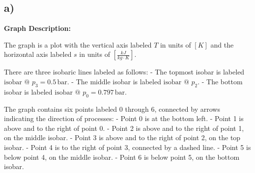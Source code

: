 

\subsection*{a)}

\begin{center}
\textbf{Graph Description:}
\end{center}

The graph is a plot with the vertical axis labeled \( T \) in units of \( [K] \) and the horizontal axis labeled \( s \) in units of \( \left[ \frac{kJ}{kg \cdot K} \right] \). 

There are three isobaric lines labeled as follows:
- The topmost isobar is labeled \( \text{isobar @ } p_3 = 0.5 \, \text{bar} \).
- The middle isobar is labeled \( \text{isobar @ } p_2 \).
- The bottom isobar is labeled \( \text{isobar @ } p_0 = 0.797 \, \text{bar} \).

The graph contains six points labeled 0 through 6, connected by arrows indicating the direction of processes:
- Point 0 is at the bottom left.
- Point 1 is above and to the right of point 0.
- Point 2 is above and to the right of point 1, on the middle isobar.
- Point 3 is above and to the right of point 2, on the top isobar.
- Point 4 is to the right of point 3, connected by a dashed line.
- Point 5 is below point 4, on the middle isobar.
- Point 6 is below point 5, on the bottom isobar.